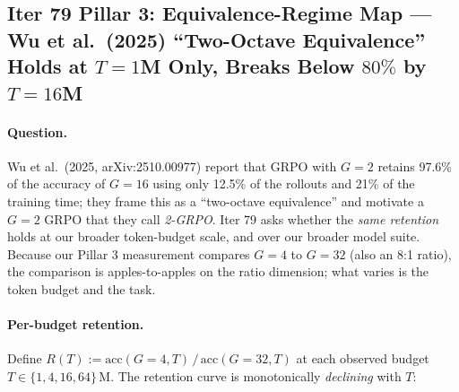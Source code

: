 \subsection{Iter 79 Pillar 3: Equivalence-Regime Map ---
              Wu et al.\ (2025) ``Two-Octave Equivalence''
              Holds at $T{=}1$M Only, Breaks Below $80\%$ by $T{=}16$M}
\label{sec:group-size-iter79}

\paragraph{Question.}
Wu et al.\ (2025, arXiv:2510.00977) report that GRPO with $G{=}2$
retains 97.6\% of the accuracy of $G{=}16$ using only 12.5\% of the
rollouts and 21\% of the training time; they frame this as a
``two-octave equivalence'' and motivate a $G{=}2$ GRPO that they
call \emph{2-GRPO}.  Iter 79 asks whether the \emph{same retention}
holds at our broader token-budget scale, and over our broader model
suite.  Because our Pillar 3 measurement compares $G{=}4$ to
$G{=}32$ (also an 8:1 ratio), the comparison is apples-to-apples on
the ratio dimension; what varies is the token budget and the task.

\paragraph{Per-budget retention.}
Define $R(T) := \mathrm{acc}(G{=}4, T)\,/\,\mathrm{acc}(G{=}32, T)$
at each observed budget $T \in \{1, 4, 16, 64\}\,\mathrm{M}$.
The retention curve is monotonically \emph{declining} with $T$:

